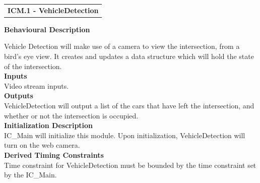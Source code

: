 \documentclass [10pt]{article}
\begin{document}






\begin{longtable}{p{}}
\rowcolor{tableCell}\textbf{ICM.1 - VehicleDetection} \\
\end{longtable}

\textbf{Behavioural Description} 

Vehicle Detection will make use of a camera to view the intersection, from a bird's eye view. It creates and updates a data structure which will hold the state of the intersection.  \\

\textbf{Inputs} \\
Video stream inputs.  \\

\textbf{Outputs} \\
VehicleDetection will output a list of the cars that have left the intersection, and whether or not the intersection is occupied.  \\

\textbf{Initialization Description} \\
IC\_Main will initialize this module. Upon initialization, VehicleDetection will turn on the web camera. \\

\textbf{Derived Timing Constraints} \\
Time constraint for VehicleDetection must be bounded by the time constraint set by the IC\_Main.  \\
\end{document}
